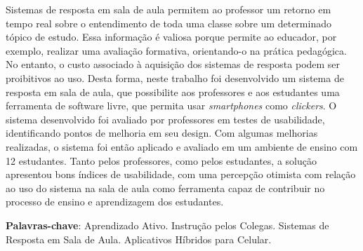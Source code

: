 \setlength{\absparsep}{18pt} %
\begin{resumo}
  Sistemas de resposta em sala de aula permitem ao professor um retorno
  em tempo real sobre o entendimento de toda uma classe sobre um determinado
  tópico de estudo. Essa informação é valiosa porque permite ao educador, por exemplo,
  realizar uma avaliação formativa, orientando-o na prática pedagógica.
  No entanto, o custo associado à aquisição dos sistemas de resposta podem ser proibitivos ao uso.
  Desta forma, neste trabalho foi desenvolvido um sistema de resposta em sala de aula,
  que possibilite aos professores e aos estudantes uma ferramenta de software livre, que permita
  usar \textit{smartphones} como \textit{clickers}.
  O sistema desenvolvido foi avaliado por professores em testes de usabilidade, identificando
  pontos de melhoria em seu design. Com algumas melhorias realizadas, o sistema foi então
  aplicado e avaliado em um ambiente de ensino com 12 estudantes.
  Tanto pelos professores, como pelos estudantes, a solução apresentou bons
  índices de usabilidade, com uma percepção otimista com relação ao uso do
  sistema na sala de aula como ferramenta capaz de contribuir no processo de ensino e aprendizagem
  dos estudantes.

 \textbf{Palavras-chave}:  Aprendizado Ativo. Instrução pelos Colegas. Sistemas de Resposta em Sala de Aula. Aplicativos Híbridos para Celular.
\end{resumo}

